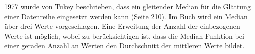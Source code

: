 1977 wurde von Tukey beschrieben, dass ein gleitender Median für die Glättung einer Datenreihe eingesetzt werden kann (Seite 210). Im Buch wird ein Median über drei Werte vorgeschlagen. Eine Erweitung der Anzahl der einbezogenen Werte ist möglich, wobei zu berücksichtigen ist, dass die Median-Funktion bei einer geraden Anzahl an Werten den Durchschnitt der mittleren Werte bildet.  




\FloatBarrier
{}



